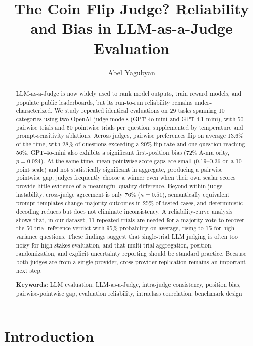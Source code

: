 \documentclass{ijclclp}
\title{The Coin Flip Judge? Reliability and Bias in LLM-as-a-Judge Evaluation}
\author{Abel Yagubyan}
\affiliation{Independent Researcher}
\begin{document}
\maketitle
\thispagestyle{firstpage}

\begin{abstract}
LLM-as-a-Judge is now widely used to rank model outputs, train reward models, and populate public leaderboards, but its run-to-run reliability remains under-characterized. We study repeated identical evaluations on 29 tasks spanning 10 categories using two OpenAI judge models (GPT-4o-mini and GPT-4.1-mini), with 50 pairwise trials and 50 pointwise trials per question, supplemented by temperature and prompt-sensitivity ablations. Across judges, pairwise preferences flip on average 13.6\% of the time, with 28\% of questions exceeding a 20\% flip rate and one question reaching 56\%. GPT-4o-mini also exhibits a significant first-position bias (72\% A-majority, $p = 0.024$). At the same time, mean pointwise score gaps are small (0.19--0.36 on a 10-point scale) and not statistically significant in aggregate, producing a pairwise--pointwise gap: judges frequently choose a winner even when their own scalar scores provide little evidence of a meaningful quality difference. Beyond within-judge instability, cross-judge agreement is only 76\% ($\kappa = 0.51$), semantically equivalent prompt templates change majority outcomes in 25\% of tested cases, and deterministic decoding reduces but does not eliminate inconsistency. A reliability-curve analysis shows that, in our dataset, 11 repeated trials are needed for a majority vote to recover the 50-trial reference verdict with 95\% probability on average, rising to 15 for high-variance questions. These findings suggest that single-trial LLM judging is often too noisy for high-stakes evaluation, and that multi-trial aggregation, position randomization, and explicit uncertainty reporting should be standard practice. Because both judges are from a single provider, cross-provider replication remains an important next step.

\vspace{0.5em}
\textbf{Keywords:} LLM evaluation, LLM-as-a-Judge, intra-judge consistency, position bias, pairwise-pointwise gap, evaluation reliability, intraclass correlation, benchmark design
\end{abstract}

\section{Introduction}
\end{document}
